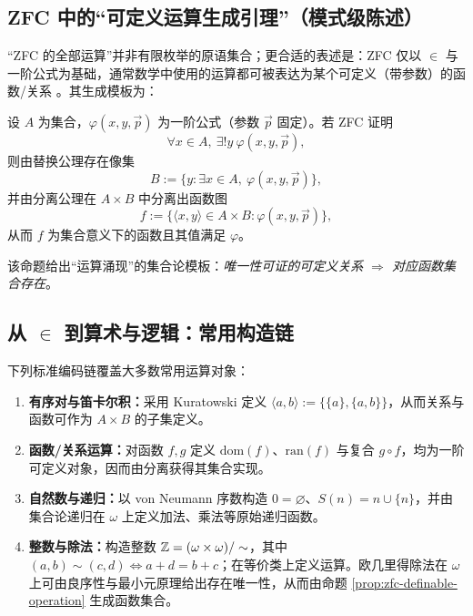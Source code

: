 \subsection{ZFC 中的“可定义运算生成引理”（模式级陈述）}
“ZFC 的全部运算”并非有限枚举的原语集合；更合适的表述是：ZFC 仅以 $\in$ 与一阶公式为基础，通常数学中使用的运算都可被表达为某个可定义（带参数）的函数/关系 \cite{Jech2003SetTheory,Kunen1980SetTheory}。其生成模板为：

\begin{proposition}[可定义运算生成引理]\label{prop:zfc-definable-operation}
设 $A$ 为集合，$\varphi(x,y,\vec{p})$ 为一阶公式（参数 $\vec{p}$ 固定）。若 ZFC 证明
$$
\forall x\in A,\ \exists !y\ \varphi(x,y,\vec{p}),
$$
则由替换公理存在像集
$$
B:=\{y:\exists x\in A,\ \varphi(x,y,\vec{p})\},
$$
并由分离公理在 $A\times B$ 中分离出函数图
$$
f:=\{\langle x,y\rangle\in A\times B:\varphi(x,y,\vec{p})\},
$$
从而 $f$ 为集合意义下的函数且其值满足 $\varphi$。
\end{proposition}

该命题给出“运算涌现”的集合论模板：\emph{唯一性可证的可定义关系 $\Rightarrow$ 对应函数集合存在}。

\subsection{从 \texorpdfstring{$\in$}{in} 到算术与逻辑：常用构造链}
下列标准编码链覆盖大多数常用运算对象：
\begin{enumerate}
  \item \textbf{有序对与笛卡尔积：}采用 Kuratowski 定义 $\langle a,b\rangle := \{\{a\},\{a,b\}\}$，从而关系与函数可作为 $A\times B$ 的子集定义。
  \item \textbf{函数/关系运算：}对函数 $f,g$ 定义 $\mathrm{dom}(f)$、$\mathrm{ran}(f)$ 与复合 $g\circ f$，均为一阶可定义对象，因而由分离获得其集合实现。
  \item \textbf{自然数与递归：}以 von Neumann 序数构造 $0=\varnothing$、$S(n)=n\cup\{n\}$，并由集合论递归在 $\omega$ 上定义加法、乘法等原始递归函数。
  \item \textbf{整数与除法：}构造整数 $\mathbb{Z}=(\omega\times\omega)/\sim$，其中 $(a,b)\sim(c,d)\iff a+d=b+c$；在等价类上定义运算。欧几里得除法在 $\omega$ 上可由良序性与最小元原理给出存在唯一性，从而由命题 \ref{prop:zfc-definable-operation} 生成函数集合。
\end{enumerate}

